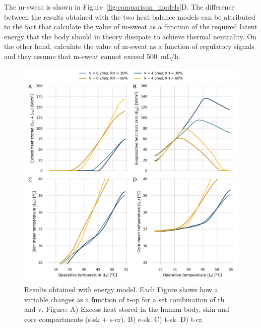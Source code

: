 The \acf{m-sweat} is shown in Figure~\ref{fig:comparison_models}D\@.
The difference between the results obtained with the two heat balance models can be attributed to the fact that \citeauthor{Jay2015} calculate the value of \ac{m-sweat} as a function of the required latent energy that the body should in theory dissipate to achieve thermal neutrality.
On the other hand, \citeauthor{GaggeSET} calculate the value of \ac{m-sweat} as a function of regulatory signals and they assume that \ac{m-sweat} cannot exceed 500~mL/h.


\begin{figure}[thb!]
    \centering
    \includegraphics[width=\textwidth]{figures/results_model_2}
    \caption{Results obtained with  energy model.
    Each Figure shows how a variable changes as a function of \ac{t-op} for a set combination of \ac{rh} and \ac{v}.
    Figure: A)  Excess heat stored in the human body, skin and core compartments (\ac{s-sk} + \ac{s-cr}).
    B) \Acf{e-sk}.
    C) \Acf{t-sk}.
    D) \Acf{t-cr}.}
    \label{fig:results_model_2}
\end{figure}

